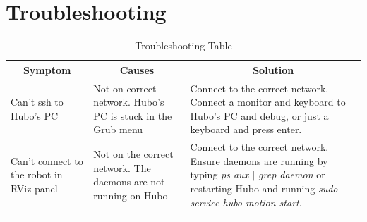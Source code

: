 \documentclass[letterpaper, 10 pt]{report}
\begin{document}
%

\newpage 
\section*{Troubleshooting}\label{sec:troubleshooting}
\begin{table}[h]
  \centering
  \caption{Troubleshooting Table}
  \begin{tabular}{|p{4.5cm}|p{4.5cm}|p{4.5cm}|} \hline
    \multicolumn{1}{|c|}{Symptom} & \multicolumn{1}{|c|}{Causes} &       \multicolumn{1}{|c|}{Solution} \\ \hline
    Can't ssh to Hubo's PC & Not on correct network. \newline Hubo's PC is stuck in the Grub menu & Connect to the correct network. \newline Connect a monitor and keyboard to Hubo's PC and debug, or just a keyboard and press enter. \\
    \hline
    Can't connect to the robot in RViz panel & Not on the correct network. \newline The daemons are not running on Hubo & Connect to the correct network. \newline Ensure daemons are running by typing \textit{ps aux $|$ grep daemon} or restarting Hubo and running \textit{sudo service hubo-motion start}. \\
    \hline
     &  &  \\
    \hline
  \end{tabular} \label{tbl:troubleshooting}
\end{table}


%

\end{document}
